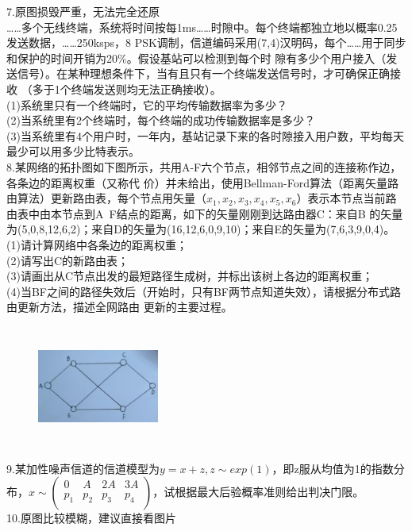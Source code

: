 \documentclass[UTF8]{ctexart}
\begin{document}
7.{\color{red}原图损毁严重，无法完全还原}\\
……多个无线终端，系统将时间按每1ms……时隙中。每个终端都独立地以概率0.25发送数据，……250ksps，8
PSK调制，信道编码采用(7,4)汉明码，每个……用于同步和保护的时间开销为20\%。假设基站可以检测到每个时
隙有多少个用户接入（发送信号）。在某种理想条件下，当有且只有一个终端发送信号时，才可确保正确接收
（多于1个终端发送则均无法正确接收）。\\
(1)系统里只有一个终端时，它的平均传输数据率为多少？\\
(2)当系统里有2个终端时，每个终端的成功传输数据率是多少？\\
(3)当系统里有4个用户时，一年内，基站记录下来的各时隙接入用户数，平均每天最少可以用多少比特表示。
\\
8.某网络的拓扑图如下图所示，共用A-F六个节点，相邻节点之间的连接称作边，各条边的距离权重（又称代
价）并未给出，使用Bellman-Ford算法（距离矢量路由算法）更新路由表，每个节点用矢量（$x_1,x_2,x_3
  ,x_4,x_5,x_6$）表示本节点当前路由表中由本节点到A~F结点的距离，如下的矢量刚刚到达路由器C：来自B
的矢量为(5,0,8,12,6,2)；来自D的矢量为(16,12,6,0,9,10)；来自E的矢量为(7,6,3,9,0,4)。\\
(1)请计算网络中各条边的距离权重；\\
(2)请写出C的新路由表；\\
(3)请画出从C节点出发的最短路径生成树，并标出该树上各边的距离权重；\\
(4)当BF之间的路径失效后（开始时，只有BF两节点知道失效），请根据分布式路由更新方法，描述全网路由
更新的主要过程。\\
\begin{figure}[H]
  \centering
  \includegraphics[width=4cm,height=4cm]{8.jpg}
\end{figure}
9.某加性噪声信道的信道模型为$y=x+z,z\sim exp(1)$，即z服从均值为1的指数分布，$x\sim
  \begin{pmatrix}
    0   & A   & 2A  & 3A  \\
    p_1 & p_2 & p_3 & p_4 \\
  \end{pmatrix}$，试根据最大后验概率准则给出判决门限。\\
10.{\color{red}原图比较模糊，建议直接看图片}
\end{document}
